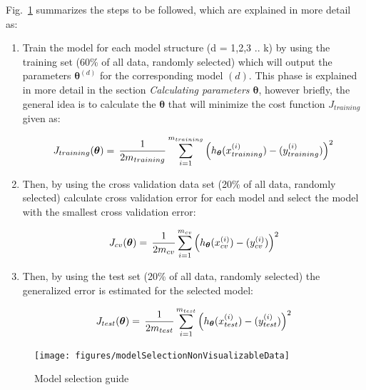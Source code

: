 Fig.~\ref{fig:modelSelection} summarizes the steps to be followed, which are explained in more detail as:

\begin{enumerate}
  \item Train the model for each model structure (d = 1,2,3 .. k) by using the training set (60\% of all data, randomly selected) which will output the parameters ${\bm{\theta}}^{(d)}$ for the corresponding model $(d)$.
  This phase is explained in more detail in the section \emph{Calculating parameters ${\bm{\theta}}$}, however briefly, the general idea is to calculate the ${\bm{\theta}}$ that will minimize the cost function $J_{training}$ given as:

\begin{equation}{\label{eqn:costFuncTraining}}
J_{training}({\bm{\theta}})
=\,
\frac{1}{2m_{training}} \sum\limits_{i=1}^{m_{training}} \Big(h_{\bm{\theta}}(x_{training}^{(i)}) - (y_{training}^{(i)})\Big)^2  
\end{equation}   
  
  \item Then, by using the cross validation data set (20\% of all data, randomly selected) calculate cross validation error for each model and select the model with the smallest cross validation error:

\begin{equation}{\label{eqn:costFuncCrossVal}}
J_{cv}({\bm{\theta}})
=\,
\frac{1}{2m_{cv}} \sum\limits_{i=1}^{m_{cv}} \Big(h_{\bm{\theta}}(x_{cv}^{(i)}) - (y_{cv}^{(i)})\Big)^2  
\end{equation} 

  \item Then, by using the test set (20\% of all data, randomly selected) the generalized error is estimated for the selected model:
  
\begin{equation}{\label{eqn:costFuncTest}}
J_{test}({\bm{\theta}})
=\,
\frac{1}{2m_{test}} \sum\limits_{i=1}^{m_{test}} \Big(h_{\bm{\theta}}(x_{test}^{(i)}) - (y_{test}^{(i)})\Big)^2  
\end{equation} 

\end{enumerate}

\begin{landscape}
\begin{figure}
\begin{center}
\texttt{[image: figures/modelSelectionNonVisualizableData]}    %
\caption{Model selection guide} 
\label{fig:modelSelection}
\end{center}
\end{figure}
\end{landscape}
 
